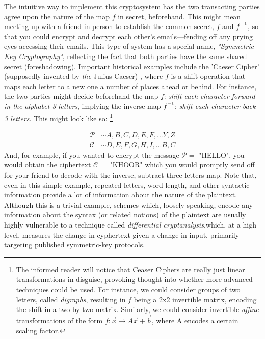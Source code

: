 \documentclass[11pt, a4paper]{report}
\newcommand{\inv}{^{\raisebox{.2em}{$\scriptscriptstyle-1$}}}
\begin{document}
The intuitive way to implement this cryptosystem has the two transacting parties agree upon the nature of the map $f$ in secret, beforehand. This might mean meeting up with a friend in-person to establish the common secret, $f$ and $f\inv$, so that you could encrypt and decrypt each other's emails—fending off any prying eyes accessing their emails. This type of system has a special name, \textit{"Symmetric Key Cryptography"}, reflecting the fact that both parties have the same shared secret (foreshadowing). Important historical examples include the 'Caeser Cipher' (supposedly invented by \textit{the} Julius Caeser)%
, where $f$ is a shift operation that maps each letter to a new one a number of places ahead or behind. For instance, the two parties might decide beforehand the map $f$: \textit{shift each character forward in the alphabet 3 letters}, implying the inverse map $f\inv$: \textit{shift each character back 3 letters}. This might look like so: \footnote[0]{The informed reader will notice that Ceaser Ciphers are really just linear transformations in disguise, provoking thought into whether more advanced techniques could be used. For instance, we could consider groups of two letters, called \textit{digraphs}, resulting in $f$ being a 2x2 invertible matrix, encoding the shift in a two-by-two matrix. Similarly, we could consider invertible \textit{affine} transformations of the form $f:\vec{x} \to A\vec{x} + \vec{b}$, where A encodes a certain scaling factor.}

\begin{align*}
 \mathcal{P} &\sim A,B,C,D,E,F,...Y,Z  \\ 
 \mathcal{C} &\sim D,E,F,G,H,I,...B,C 
\end{align*} %
And, for example, if you wanted to encrypt the message $\mathcal{P} =$ "HELLO", you would obtain the ciphertext $\mathcal{C} =$ "KHOOR" which you would promptly send off for your friend to decode with the inverse, subtract-three-letters map. Note that, even in this simple example, repeated letters, word length, and other syntactic information provide a lot of information about the nature of the plaintext. Although this is a trivial example, schemes which, loosely speaking, encode any information about the syntax (or related notions) of the plaintext are usually highly vulnerable to a technique called \textit{differential cryptanalysis},which, at a high level, measures the change in cyphertext given a change in input, primarily targeting published symmetric-key protocols.\autocite[56]{koblitz} 
\end{document}
